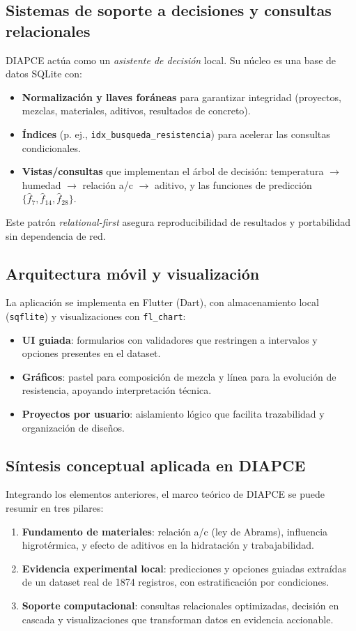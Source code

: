 \documentclass[12pt, letterpaper]{article}
\begin{document}
\subsection{Sistemas de soporte a decisiones y consultas relacionales}
DIAPCE actúa como un \textit{asistente de decisión} local. Su núcleo es una base de datos SQLite con:
\begin{itemize}
    \item \textbf{Normalización y llaves foráneas} para garantizar integridad (proyectos, mezclas, materiales, aditivos, resultados de concreto).
    \item \textbf{Índices} (p. ej., \texttt{idx\_busqueda\_resistencia}) para acelerar las consultas condicionales.
    \item \textbf{Vistas/consultas} que implementan el árbol de decisión: 
    temperatura $\rightarrow$ humedad $\rightarrow$ relación a/c $\rightarrow$ aditivo, 
    y las funciones de predicción $\{\hat f_7,\hat f_{14},\hat f_{28}\}$.
\end{itemize}
Este patrón \textit{relational-first} asegura reproducibilidad de resultados y portabilidad sin dependencia de red.

\subsection{Arquitectura móvil y visualización}
La aplicación se implementa en Flutter (Dart), con almacenamiento local (\texttt{sqflite}) y visualizaciones con \texttt{fl\_chart}:
\begin{itemize}
    \item \textbf{UI guiada}: formularios con validadores que restringen a intervalos y opciones presentes en el dataset.
    \item \textbf{Gráficos}: pastel para composición de mezcla y línea para la evolución de resistencia, apoyando interpretación técnica.
    \item \textbf{Proyectos por usuario}: aislamiento lógico que facilita trazabilidad y organización de diseños.
\end{itemize}

\subsection{Síntesis conceptual aplicada en DIAPCE}
Integrando los elementos anteriores, el marco teórico de DIAPCE se puede resumir en tres pilares:
\begin{enumerate}
    \item \textbf{Fundamento de materiales}: relación a/c (ley de Abrams), influencia higrotérmica, y efecto de aditivos en la hidratación y trabajabilidad.
    \item \textbf{Evidencia experimental local}: predicciones y opciones guiadas extraídas de un dataset real de 1874 registros, con estratificación por condiciones.
    \item \textbf{Soporte computacional}: consultas relacionales optimizadas, decisión en cascada y visualizaciones que transforman datos en evidencia accionable.
\end{enumerate}
\end{document}
